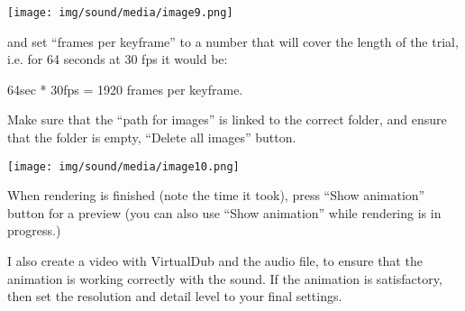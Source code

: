 \texttt{[image: img/sound/media/image9.png]}

and set ``frames per keyframe'' to a number that will cover the length
of the trial, i.e. for 64 seconds at 30 fps it would be:

64sec * 30fps = 1920 frames per keyframe.

Make sure that the ``path for images'' is linked to the correct folder,
and ensure that the folder is empty, ``Delete all images'' button.

\texttt{[image: img/sound/media/image10.png]}

When rendering is finished (note the time it took), press ``Show
animation'' button for a preview (you can also use ``Show animation''
while rendering is in progress.)

I also create a video with VirtualDub and the audio file, to ensure that
the animation is working correctly with the sound. If the animation is
satisfactory, then set the resolution and detail level to your final
settings.
